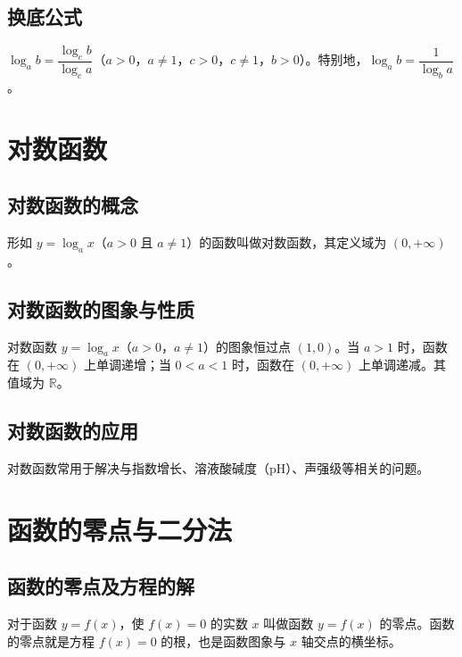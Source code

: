 \subsection{换底公式}
\begin{definition}[换底公式]
$\log_a b=\dfrac{\log_c b}{\log_c a}$（$a>0$，$a \neq 1$，$c>0$，$c \neq 1$，$b>0$）。特别地，$\log_a b=\dfrac{1}{\log_b a}$。
\end{definition}

\section{对数函数}
\subsection{对数函数的概念}
\begin{definition}[对数函数]
形如 $y=\log_a x$（$a>0$ 且 $a \neq 1$）的函数叫做对数函数，其定义域为 $(0,+\infty)$。
\end{definition}
\subsection{对数函数的图象与性质}
\begin{definition}[对数函数的性质]
对数函数 $y=\log_a x$（$a>0$，$a \neq 1$）的图象恒过点 $(1,0)$。当 $a>1$ 时，函数在 $(0,+\infty)$ 上单调递增；当 $0<a<1$ 时，函数在 $(0,+\infty)$ 上单调递减。其值域为 $\mathbb{R}$。
\end{definition}
\subsection{对数函数的应用}
\begin{definition}[对数函数的应用]
对数函数常用于解决与指数增长、溶液酸碱度（$\mathrm{pH}$）、声强级等相关的问题。
\end{definition}

\section{函数的零点与二分法}
\subsection{函数的零点及方程的解}
\begin{definition}[函数的零点]
对于函数 $y=f(x)$，使 $f(x)=0$ 的实数 $x$ 叫做函数 $y=f(x)$ 的零点。函数的零点就是方程 $f(x)=0$ 的根，也是函数图象与 $x$ 轴交点的横坐标。
\end{definition}
